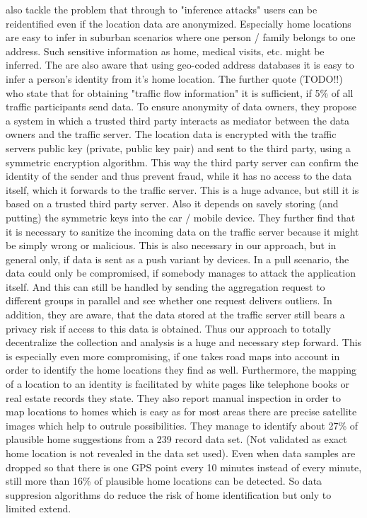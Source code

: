\parencite{hoh2006enhancing} also tackle the problem that through to "inference attacks" users can be reidentified even if the location data are anonymized. Especially home locations are easy to infer in suburban scenarios where one person / family belongs to one address. Such sensitive information as home, medical visits, etc. might be inferred. The are also aware that using geo-coded address databases it is easy to infer a person's identity from it's home location. The further quote \parencite{dai2003simulation} (TODO!!) who state that for obtaining "traffic flow information" it is sufficient, if 5\% of all traffic participants send data. To ensure anonymity of data owners, they propose a system in which a trusted third party interacts as mediator between the data owners and the traffic server. The location data is encrypted with the traffic servers public key (private, public key pair) and sent to the third party, using a symmetric encryption algorithm. This way the third party server can confirm the identity of the sender and thus prevent fraud, while it has no access to the data itself, which it forwards to the traffic server. This is a huge advance, but still it is based on a trusted third party server. Also it depends on savely storing (and putting) the symmetric keys into the car / mobile device. They further find that it is necessary to sanitize the incoming data on the traffic server because it might be simply wrong or malicious. This is also necessary in our approach, but in general only, if data is sent as a push variant by devices. In a pull scenario, the data could only be compromised, if somebody manages to attack the application itself. And this can still be handled by sending the aggregation request to different groups in parallel and see whether one request delivers outliers. In addition, they are aware, that the data stored at the traffic server still bears a privacy risk if access to this data is obtained. Thus our approach to totally decentralize the collection and analysis is a huge and necessary step forward. This is especially even more compromising, if one takes road maps into account in order to identify the home locations they find as well. Furthermore, the mapping of a location to an identity is facilitated by white pages like telephone books or real estate records they state. They also report manual inspection in order to map locations to homes which is easy as for most areas there are precise satellite images which help to outrule possibilities. They manage to identify about 27\% of plausible home suggestions from a 239 record data set. (Not validated as exact home location is not revealed in the data set used). Even when data samples are dropped so that there is one GPS point every 10 minutes instead of every minute, still more than 16\% of plausible home locations can be detected. So data suppresion algorithms do reduce the risk of home identification but only to limited extend.
